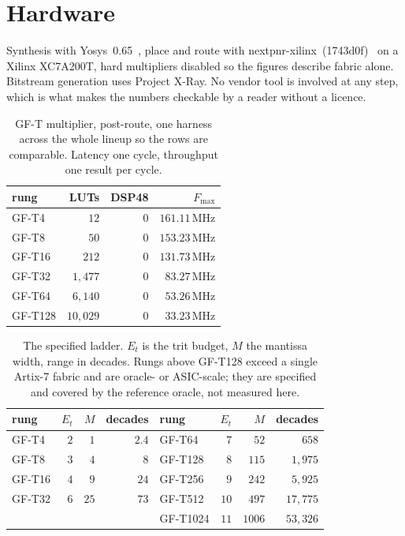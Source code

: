 \documentclass[11pt]{article}
\theoremstyle{definition}
\begin{document}
\section{Hardware}\label{sec:hardware}

Synthesis with Yosys~0.65~\cite{yosys}, place and route with
nextpnr-xilinx~(1743d0f)~\cite{nextpnr} on a
Xilinx XC7A200T, hard multipliers disabled so the figures describe fabric alone.
Bitstream generation uses Project X-Ray. No vendor tool is involved at any step,
which is what makes the numbers checkable by a reader without a licence.

\begin{table}[t]\centering
\caption{GF-T multiplier, post-route, one harness across the whole lineup so the
rows are comparable. Latency one cycle, throughput one result per cycle.}
\label{tab:ladder}
\begin{tabular}{lrrr}
\toprule
rung & LUTs & DSP48 & $F_{\max}$ \\
\midrule
GF-T4  & $12$      & $0$ & $161.11$\,MHz \\
GF-T8  & $50$      & $0$ & $153.23$\,MHz \\
GF-T16 & $212$     & $0$ & $131.73$\,MHz \\
GF-T32  & $1{,}477$  & $0$ & $83.27$\,MHz \\
GF-T64  & $6{,}140$  & $0$ & $53.26$\,MHz \\
GF-T128 & $10{,}029$ & $0$ & $33.23$\,MHz \\
\bottomrule
\end{tabular}
\end{table}

\begin{table}[t]\centering
\caption{The specified ladder. $E_t$ is the trit budget, $M$ the mantissa width,
range in decades. Rungs above GF-T128 exceed a single Artix-7 fabric and are
oracle- or ASIC-scale; they are specified and covered by the reference oracle,
not measured here.}
\label{tab:spec}
\begin{tabular}{lrrr@{\hskip 2em}lrrr}
\toprule
rung & $E_t$ & $M$ & decades & rung & $E_t$ & $M$ & decades \\
\midrule
GF-T4  & $2$ & $1$  & $2.4$ & GF-T64   & $7$  & $52$   & $658$ \\
GF-T8  & $3$ & $4$  & $8$   & GF-T128  & $8$  & $115$  & $1{,}975$ \\
GF-T16 & $4$ & $9$  & $24$  & GF-T256  & $9$  & $242$  & $5{,}925$ \\
GF-T32 & $6$ & $25$ & $73$  & GF-T512  & $10$ & $497$  & $17{,}775$ \\
       &     &      &       & GF-T1024 & $11$ & $1006$ & $53{,}326$ \\
\bottomrule
\end{tabular}
\end{table}
\end{document}
